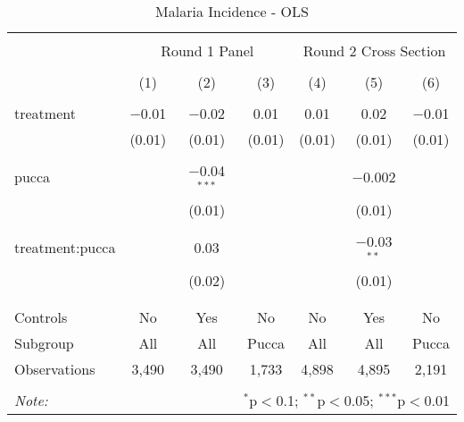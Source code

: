
\begin{table}[!htbp] \centering 
  \caption{Malaria Incidence - OLS} 
  \label{tbl:Malaria Incidence - OLS} 
\begin{tabular}{@{\extracolsep{5pt}}lcccccc} 
\\[-1.8ex]\hline 
\hline \\[-1.8ex] 
 & \multicolumn{3}{c}{Round 1 Panel} & \multicolumn{3}{c}{Round 2 Cross Section} \\ 
\\[-1.8ex] & (1) & (2) & (3) & (4) & (5) & (6)\\ 
\hline \\[-1.8ex] 
 treatment & $-$0.01 & $-$0.02 & 0.01 & 0.01 & 0.02 & $-$0.01 \\ 
  & (0.01) & (0.01) & (0.01) & (0.01) & (0.01) & (0.01) \\ 
  & & & & & & \\ 
 pucca &  & $-$0.04$^{***}$ &  &  & $-$0.002 &  \\ 
  &  & (0.01) &  &  & (0.01) &  \\ 
  & & & & & & \\ 
 treatment:pucca &  & 0.03 &  &  & $-$0.03$^{**}$ &  \\ 
  &  & (0.02) &  &  & (0.01) &  \\ 
  & & & & & & \\ 
\hline \\[-1.8ex] 
Controls & No & Yes & No & No & Yes & No \\ 
Subgroup & All & All & Pucca & All & All & Pucca \\ 
Observations & 3,490 & 3,490 & 1,733 & 4,898 & 4,895 & 2,191 \\ 
\hline 
\hline \\[-1.8ex] 
\textit{Note:}  & \multicolumn{6}{r}{$^{*}$p$<$0.1; $^{**}$p$<$0.05; $^{***}$p$<$0.01} \\ 
\end{tabular} 
\end{table} 
